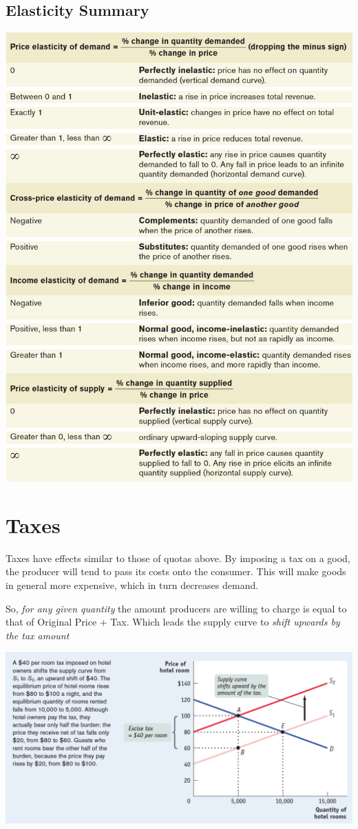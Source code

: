 \documentclass[english,course, draft]{Notes}
\newcommand{\ita}[1]{\textit{#1}}
\begin{document}
\subsection{Elasticity Summary}
\includegraphics[height=1.1\textwidth]{elasticSum}
 
 \newpage
 
 \section{Taxes} 


\par{Taxes have effects similar to those of quotas above. By imposing a tax on a good, the producer will tend to pass its costs onto the consumer. This will make goods in general more expensive, which in turn decreases demand.}
\par{So, \ita{for any given quantity} the amount producers are willing to charge is equal to that of Original Price + Tax. Which leads the supply curve to \ita{shift upwards by the tax amount}}

\includegraphics[width=\textwidth]{tax1}
\end{document}

